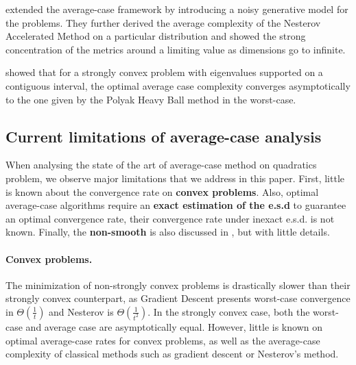 \documentclass{article}
\begin{document}
\cite{paquette2020halting}  extended the average-case framework by introducing a noisy generative model for the problems. They further derived the average complexity of the Nesterov Accelerated Method \cite{nesterov2003introductory} on a particular distribution and showed the strong concentration of the metrics around a limiting value as dimensions go to infinite. 


\cite{scieur2020universal} showed that for a strongly convex problem with eigenvalues supported on a contiguous interval, the optimal average case complexity converges asymptotically to the one given by the Polyak Heavy Ball method in the worst-case.  


\subsection{Current limitations of average-case analysis} 

When analysing the state of the art of average-case method on quadratics problem, we observe major limitations that we address in this paper. First, little is known about the convergence rate on \textbf{convex problems}. Also, optimal average-case algorithms require an \textbf{exact estimation of the e.s.d} to guarantee an optimal convergence rate, their convergence rate under inexact e.s.d. is not known. Finally, the \textbf{non-smooth} is also discussed in \citep{pedregosa2020acceleration}, but with little details.

\paragraph{Convex problems.} The minimization of non-strongly convex problems is drastically slower than their strongly convex counterpart, as Gradient Descent presents worst-case convergence in $\Theta(\frac{1}{t})$ and Nesterov is $\Theta(\frac{1}{t^2})$. In the strongly convex case, both the worst-case and average case are asymptotically equal. However, little is known on optimal average-case rates for convex problems, as well as the average-case complexity of classical methods such as gradient descent or Nesterov's method.
\end{document}
